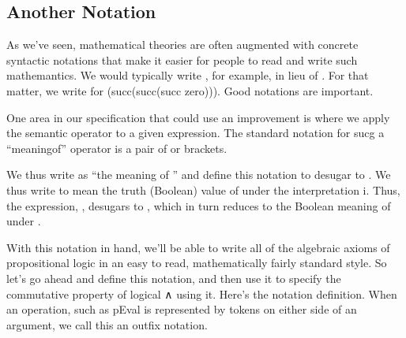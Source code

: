 \documentclass[letterpaper,10pt,english]{sphinxmanual}
\begin{document}
\subsection{Another Notation}
\label{\detokenize{A_01_Propositional_Logic:another-notation}}
\sphinxAtStartPar
As we’ve seen, mathematical theories are often
augmented with concrete syntactic notations that
make it easier for people to read and write such
mathemantics. We would typically write ,
for example, in lieu of . For that
matter, we write  for (succ(succ(succ zero))).
Good notations are important.

\sphinxAtStartPar
One area in our specification that could use an
improvement is where we apply the  semantic
 operator to a given expression. The
standard notation for sucg a “meaning\sphinxhyphen{}of” operator
is a pair of  or  brackets.

\sphinxAtStartPar
We thus write  as “the meaning of ” and
define this notation to desugar to . We
thus  write  to mean the truth (Boolean)
value of  under the interpretation i. Thus, the
expression, , desugars to  ,
which in turn reduces to the Boolean meaning of
 under .

\sphinxAtStartPar
With this notation in hand, we’ll be able to write
all of the algebraic axioms of propositional logic
in an easy to read, mathematically fairly standard
style. So let’s go ahead and define this notation,
and then use it to specify the commutative property
of logical ∧ using it.
Here’s the notation definition. When an operation,
such as pEval is represented by tokens on either side
of an argument, we call this an outfix notation.

\begin{sphinxVerbatim}[commandchars=\\\{\}]
               
\end{sphinxVerbatim}
\end{document}
